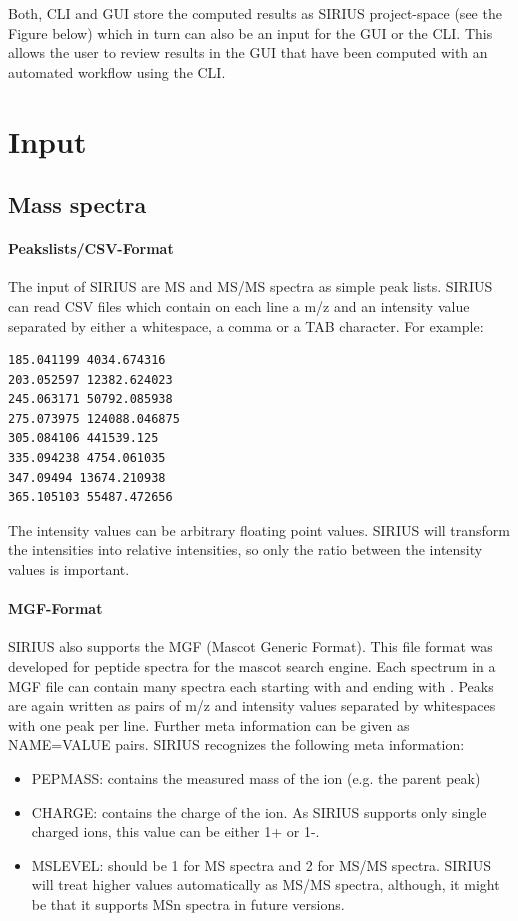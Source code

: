 \documentclass[letterpaper,10pt,openany,oneside]{sphinxmanual}
\begin{document}
Both, CLI and GUI store the computed results as SIRIUS project-space (see the Figure below) which in turn can also be an input for the GUI or the CLI. 
This allows the user to review results in the GUI that have been computed with an automated workflow using the CLI. 

\section{Input}
\label{commandline:inputformats}\label{commandline:supported-input-formats}

\subsection{Mass spectra}
\label{commandline:mass-spectra}
\paragraph{Peakslists/CSV-Format}
The input of SIRIUS are MS and MS/MS spectra as simple peak lists. SIRIUS can read CSV files which contain on each line a m/z and an intensity value separated by either a whitespace, a comma or a TAB character. For example:

\begin{Verbatim}[commandchars=\\\{\}]
185.041199 4034.674316
203.052597 12382.624023
245.063171 50792.085938
275.073975 124088.046875
305.084106 441539.125
335.094238 4754.061035
347.09494 13674.210938
365.105103 55487.472656
\end{Verbatim}

The intensity values can be arbitrary floating point values. SIRIUS will transform the intensities into relative intensities, so only the ratio between the intensity values is important.

\paragraph{MGF-Format}
SIRIUS also supports the MGF (Mascot Generic Format). This file format was developed for peptide spectra for the mascot search engine. Each spectrum in a MGF file can contain many spectra each starting with  and ending with . Peaks are again written as pairs of m/z and intensity values separated by whitespaces with one peak per line. Further meta information can be given as NAME=VALUE pairs. SIRIUS recognizes the following meta information:
\begin{itemize}
	\item {} 
	PEPMASS: contains the measured mass of the ion (e.g. the parent peak)
	
	\item {} 
	CHARGE: contains the charge of the ion. As SIRIUS supports only single charged ions, this value can be either 1+ or 1-.
	
	\item {} 
	MSLEVEL: should be 1 for MS spectra and 2 for MS/MS spectra. SIRIUS will treat higher values automatically as MS/MS spectra, although, it might be that it supports MSn spectra in future versions.
	
\end{itemize}
\end{document}
